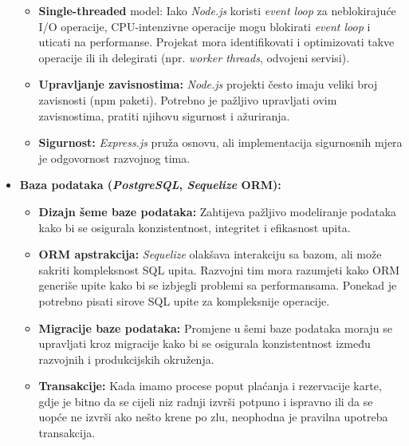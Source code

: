 \begin{itemize}
\begin{itemize}
            \item \textbf{Single-threaded} model: Iako \textit{Node.js} koristi \textit{event loop} za neblokirajuće I/O operacije, CPU-intenzivne operacije mogu blokirati \textit{event loop} i uticati na performanse. Projekat mora identifikovati i optimizovati takve operacije ili ih delegirati (npr. \textit{worker threads}, odvojeni servisi).
            
            \item \textbf{Upravljanje zavisnostima:} \textit{Node.js} projekti često imaju veliki broj zavisnosti (npm paketi). Potrebno je pažljivo upravljati ovim zavisnostima, pratiti njihovu sigurnost i ažuriranja.
            
            \item \textbf{Sigurnost:} \textit{Express.js} pruža osnovu, ali implementacija sigurnosnih mjera je odgovornost razvojnog tima.
        \end{itemize}
    
    \item \textbf{Baza podataka (\textit{PostgreSQL}, \textit{Sequelize} ORM):}

        \begin{itemize}
            \item \textbf{Dizajn šeme baze podataka:} Zahtijeva pažljivo modeliranje podataka kako bi se osigurala konzistentnost, integritet i efikasnost upita.
            
            \item \textbf{ORM apstrakcija:} \textit{Sequelize} olakšava interakciju sa bazom, ali može sakriti kompleksnost SQL upita. Razvojni tim mora razumjeti kako ORM generiše upite kako bi se izbjegli problemi sa performansama. Ponekad je potrebno pisati sirove SQL upite za kompleksnije operacije.
            
            \item \textbf{Migracije baze podataka:} Promjene u šemi baze podataka moraju se upravljati kroz migracije kako bi se osigurala konzistentnost između razvojnih i produkcijskih okruženja.
            
            \item \textbf{Transakcije:} Kada imamo procese poput plaćanja i rezervacije karte, gdje je bitno da se cijeli niz radnji izvrši potpuno i ispravno ili da se uopće ne izvrši ako nešto krene po zlu, neophodna je pravilna upotreba transakcija.
        \end{itemize}
    

\end{itemize}
